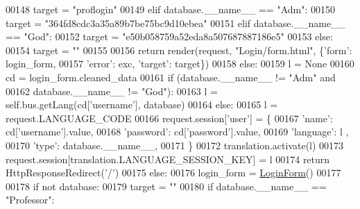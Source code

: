 \begin{DoxyCode}
00148                     target = \textcolor{stringliteral}{"proflogin"}
00149                 \textcolor{keywordflow}{elif} database.\_\_name\_\_ == \textcolor{stringliteral}{"Adm"}:
00150                     target = \textcolor{stringliteral}{"364fd8cdc3a35a89b7be75bc9d10ebea"}
00151                 \textcolor{keywordflow}{elif} database.\_\_name\_\_ == \textcolor{stringliteral}{"God"}:
00152                     target = \textcolor{stringliteral}{"e50b058759a52eda8a507687887186e5"}
00153                 \textcolor{keywordflow}{else}:
00154                     target = \textcolor{stringliteral}{""}
00155 
00156                 \textcolor{keywordflow}{return} render(request, \textcolor{stringliteral}{"Login/form.html"}, \{\textcolor{stringliteral}{'form'}: login\_form, 
00157                     \textcolor{stringliteral}{'error'}: exc, \textcolor{stringliteral}{'target'}: target\})
00158             \textcolor{keywordflow}{else}:
00159                 l = \textcolor{keywordtype}{None}
00160                 cd = login\_form.cleaned\_data
00161                 \textcolor{keywordflow}{if} (database.\_\_name\_\_ != \textcolor{stringliteral}{"Adm"} \textcolor{keywordflow}{and}
00162                     database.\_\_name\_\_ != \textcolor{stringliteral}{"God"}):
00163                     l = self.bus.getLang(cd[\textcolor{stringliteral}{'username'}], database)
00164                 \textcolor{keywordflow}{else}:
00165                     l = request.LANGUAGE\_CODE
00166                 request.session[\textcolor{stringliteral}{'user'}] = \{
00167                                 \textcolor{stringliteral}{'name'}: cd[\textcolor{stringliteral}{'username'}].value,
00168                                 \textcolor{stringliteral}{'password'}: cd[\textcolor{stringliteral}{'password'}].value,
00169                                 \textcolor{stringliteral}{'language'}: l ,
00170                                 \textcolor{stringliteral}{'type'}: database.\_\_name\_\_,
00171                             \}
00172                 translation.activate(l)
00173                 request.session[translation.LANGUAGE\_SESSION\_KEY] = l
00174                 \textcolor{keywordflow}{return} HttpResponseRedirect(\textcolor{stringliteral}{'/'})
00175         \textcolor{keywordflow}{else}:
00176             login\_form = \hyperlink{classLogin_1_1forms_1_1LoginForm}{LoginForm}()
00177 
00178             \textcolor{keywordflow}{if} \textcolor{keywordflow}{not} database:
00179                 target = \textcolor{stringliteral}{""}
00180             \textcolor{keywordflow}{if} database.\_\_name\_\_ == \textcolor{stringliteral}{"Professor"}:

\end{DoxyCode}
